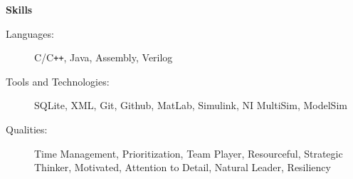 \documentclass[letterpaper,11pt]{article}
\newcommand{\resheading}[1]{{\large \colorbox{mygrey}{\begin{minipage}{\textwidth}{\textbf{#1 \vphantom{p\^{E}}}}\end{minipage}}}}
\begin{document}

\resheading{Skills}

\begin{description}
\item[Languages:]
C/C{}\verb!++!, Java, Assembly, Verilog
\item[Tools and Technologies:]
SQLite, XML, Git, Github, MatLab, Simulink, NI MultiSim, ModelSim
\item[Qualities:]
Time Management, Prioritization, Team Player, Resourceful, Strategic Thinker, Motivated, Attention to Detail, Natural Leader, Resiliency
\end{description}


\pagebreak
\end{document}
